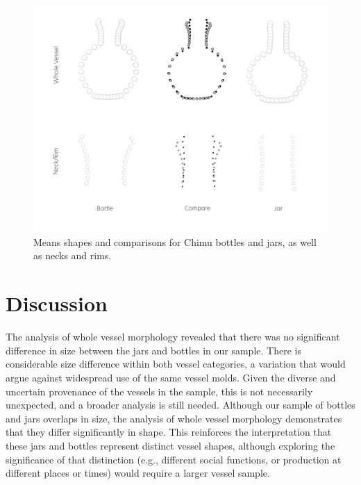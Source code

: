 \documentclass[]{interact}
\theoremstyle{plain}%
\theoremstyle{definition}
\theoremstyle{remark}
\begin{document}
\begin{figure}\centering
\includegraphics[width=\linewidth]{figs/mshape.compare.png}
\caption{Means shapes and comparisons for Chimu bottles and jars, as well as necks and rims. }
\label{fig:mshape}
\end{figure}

\hypertarget{discussion}{%
\section{Discussion}\label{discussion}}

The analysis of whole vessel morphology revealed that there was no
significant difference in size between the jars and bottles in our
sample. There is considerable size difference within both vessel
categories, a variation that would argue against widespread use of the
same vessel molds. Given the diverse and uncertain provenance of the
vessels in the sample, this is not necessarily unexpected, and a broader
analysis is still needed. Although our sample of bottles and jars
overlaps in size, the analysis of whole vessel morphology demonstrates
that they differ significantly in shape. This reinforces the
interpretation that these jars and bottles represent distinct vessel
shapes, although exploring the significance of that distinction (e.g.,
different social functions, or production at different places or times)
would require a larger vessel sample.
\end{document}
